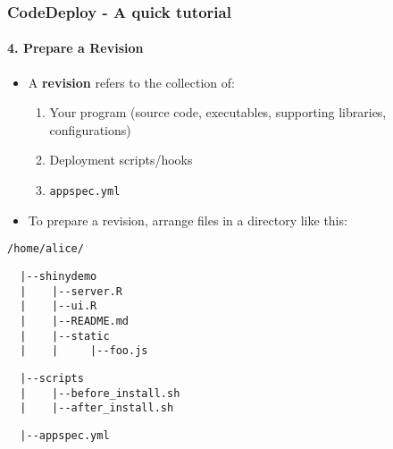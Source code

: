 \documentclass[10pt]{beamer}
\begin{document}
\begin{frame}[fragile]
    \frametitle{CodeDeploy - A quick tutorial}
    \framesubtitle{4. Prepare a Revision}
    \begin{itemize}
        \item A {\bf revision} refers to the collection of:
            \begin{enumerate}
                \item {\color{red} Your program (source code, executables, supporting libraries, configurations)}
                \item {\color{magenta} Deployment scripts/hooks}
                \item {\color{cyan} \tt appspec.yml}
            \end{enumerate}
        \item To prepare a revision, arrange files in a directory like this:
    \end{itemize}
    {\small
\begin{verbatim}
/home/alice/
\end{verbatim}
}
\vspace{-0.1in}
{\color{red}\small
\begin{verbatim}
  |--shinydemo
  |    |--server.R
  |    |--ui.R
  |    |--README.md
  |    |--static
  |    |     |--foo.js
\end{verbatim}
}
\vspace{-0.1in}
{\color{magenta}\small
\begin{verbatim}
  |--scripts 
  |    |--before_install.sh
  |    |--after_install.sh
\end{verbatim}
}
\vspace{-0.1in}
{\color{cyan}\small
\begin{verbatim}
  |--appspec.yml
\end{verbatim}
}


\end{frame}
\end{document}
